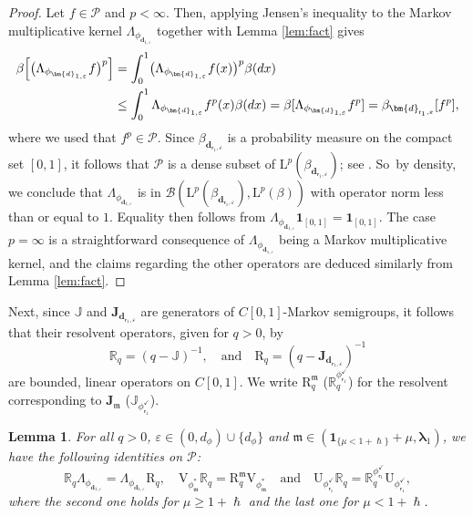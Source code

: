 \documentclass[JEP,XML,SOM,Unicode]{cedram}
\let\epsilon\varepsilon
\theoremstyle{plain}
\newtheorem{lemma}[theorem]{Lemma}
\theoremstyle{definition}
\newcommand{\Poly}{\mathscr{P}}
\newcommand{\calJ}{\mathds{J}}
\newcommand{\Leb}{\mathrm{L}}
\newcommand{\calJd}{\mathbf{J}}
\newcommand{\m}{\mathfrak{m}}
\newcommand{\dpt}{\bm{d}_{\vat,\epsilon}}
\newcommand{\dz}{{\bm{d}}_{1,\epsilon}}
\newcommand{\Bop}[2]{\mathcal{B}(#1,#2)}
\newcommand{\lam}{{\bm{\lambda}_1}}
\newcommand{\vat}{{\mathsf{r}_1}}
\newcommand{\phm}{{\phi_\m^*}}
\renewcommand{\varphi}{{\phi_{\vat}^{\checkmark}}}
\newcommand{\gab}[1][\lam,\mo]{{\beta_{#1}}}
\let\h\hslash
\let\mo\mu
\let\bpsi\beta
\begin{document}
\begin{proof}
Let $f \in \Poly$ and $p < \infty$. Then, applying Jensen's inequality to the Markov multiplicative kernel $\Lambda_{\phi_{\dz}}$ together with Lemma \ref{lem:fact} gives
\begin{align*}
\bpsi \Bigl[ \bigl(\Lambda_{\phi_{\dz}} f\bigr)^p\Bigr] &= \int_0^1 \bigl(\Lambda_{\phi_{\dz}} f(x) \bigr)^p \bpsi(dx)\\
&\leq \int_0^1 \Lambda_{\phi_{\dz}} f^p(x) \bpsi(dx) = \bpsi[\Lambda_{\phi_{\dz}} f^p] = \gab[\dpt] [ f^p],
\end{align*}
where we used that $f^p \in \Poly$. Since $\gab[\dpt]$ is a probability measure on the compact set $[0,1]$, it follows that $\Poly$ is a dense subset of $\Leb^p(\gab[\dpt])$; see \eg \cite[Cor.\,22.10]{Driver03}. So~by density, we conclude that $\Lambda_{\phi_{\dz}}$ is in $\Bop{\Leb^p(\gab[\dpt])}{\Leb^p(\bpsi)}$ with operator norm less than or equal to $1$. Equality then follows from $\Lambda_{\phi_{\dz}} \bm{1}_{[0,1]} = \bm{1}_{[0,1]}$. The case $p = \infty$ is a straightforward consequence of $\Lambda_{\phi_{\dz}}$ being a Markov multiplicative kernel, and the claims regarding the other operators are deduced similarly from Lemma \ref{lem:fact}.
\end{proof}

Next, since $\calJ$ and $\calJd_{\dpt}$ are generators of $C[0,1]$-Markov semigroups, it follows that their resolvent operators, given for $q > 0$, by
\begin{equation*}
\mathds{R}_q = (q-\calJ)^{-1}, \quad \text{and} \quad {\mathrm{R}}_q = (q-\calJd_{\dpt})^{-1}
\end{equation*}
are bounded, linear operators on $C[0,1]$. We write ${\mathrm{R}}_q^\m$ (\resp $\mathds{R}_q^\varphi$) for the resolvent corresponding to $\mathbf{J}_\m$ (\resp $\calJ_\varphi$).

\begin{lemma}
\label{prop:resolvent-intertwining}
For all $q > 0$, $\epsilon \in (0,d_\phi) \cup \{d_\phi\}$ and $\m \in (\bm{1}_{\{\mo < 1+\h\}}+\mo,\lam)$,
we have the following identities on $\Poly$:
\begin{equation*}
\mathds{R}_q \Lambda_{\phi_{\dz}} = \Lambda_{\phi_{\dz}} \mathrm{R}_q, \quad \mathrm{V}_{\phm} \mathds{R}_q = \mathrm{R}_q^\m \mathrm{V}_{\phm} \quad \text{and} \quad {\mathrm{U}_\varphi} \mathds{R}_q = \mathds{R}_q^\varphi {\mathrm{U}}_\varphi,
\end{equation*}
where the second one holds for $\mo \ge 1 +\h$ and the last one for $\mo < 1 + \h$.
\end{lemma}
\end{document}
